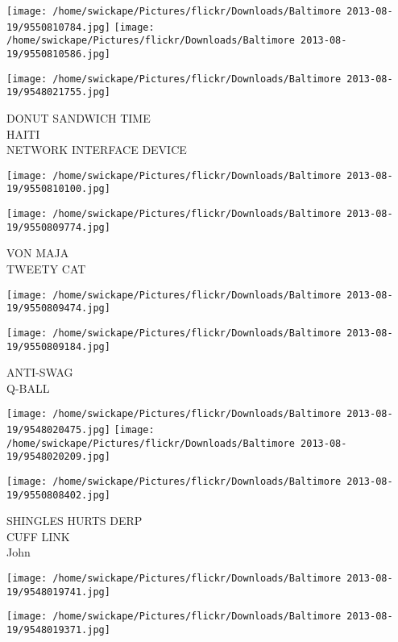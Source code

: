 \documentclass[10pt,letterpaper]{article}
\begin{document}
\texttt{[image: /home/swickape/Pictures/flickr/Downloads/Baltimore 2013-08-19/9550810784.jpg]}
\texttt{[image: /home/swickape/Pictures/flickr/Downloads/Baltimore 2013-08-19/9550810586.jpg]}

\texttt{[image: /home/swickape/Pictures/flickr/Downloads/Baltimore 2013-08-19/9548021755.jpg]}

DONUT SANDWICH TIME\\
HAITI\\
NETWORK INTERFACE DEVICE\\
\pagebreak

\texttt{[image: /home/swickape/Pictures/flickr/Downloads/Baltimore 2013-08-19/9550810100.jpg]}

\vspace{0.25in}
\texttt{[image: /home/swickape/Pictures/flickr/Downloads/Baltimore 2013-08-19/9550809774.jpg]}

VON MAJA\\
TWEETY CAT\\
\pagebreak

\texttt{[image: /home/swickape/Pictures/flickr/Downloads/Baltimore 2013-08-19/9550809474.jpg]}

\vspace{0.25in}
\texttt{[image: /home/swickape/Pictures/flickr/Downloads/Baltimore 2013-08-19/9550809184.jpg]}

ANTI{-}SWAG\\
Q{-}BALL\\
\pagebreak

\texttt{[image: /home/swickape/Pictures/flickr/Downloads/Baltimore 2013-08-19/9548020475.jpg]}
\texttt{[image: /home/swickape/Pictures/flickr/Downloads/Baltimore 2013-08-19/9548020209.jpg]}

\texttt{[image: /home/swickape/Pictures/flickr/Downloads/Baltimore 2013-08-19/9550808402.jpg]}

SHINGLES HURTS DERP\\
CUFF LINK\\
John\\
\pagebreak

\texttt{[image: /home/swickape/Pictures/flickr/Downloads/Baltimore 2013-08-19/9548019741.jpg]}

\vspace{0.25in}
\texttt{[image: /home/swickape/Pictures/flickr/Downloads/Baltimore 2013-08-19/9548019371.jpg]}
\end{document}
